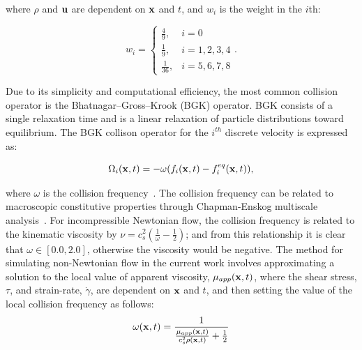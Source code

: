 \noindent where $\rho$ and $\mathbf{u}$ are dependent on $\mathbf{x}$ and $t$, and $w_i$ is the weight in the $i$th:%

\begin{equation} \label{eq:weights}
w_i = \begin{cases}
    \frac{4}{9}, & i = 0 \\
    \frac{1}{9}, & i = 1, 2, 3, 4 \\
    \frac{1}{36}, & i = 5, 6, 7, 8
\end{cases}.
\end{equation}

Due to its simplicity and computational efficiency, the most common collision operator is the Bhatnagar--Gross--Krook (BGK) operator.
BGK consists of a single relaxation time and is a linear relaxation of particle distributions toward equilibrium.
The BGK collison operator for the $i^{th}$ discrete velocity is expressed as:

\begin{equation} \label{eq:bgk}
\Omega_i(\mathbf{x}, t) = -\omega (f_i(\mathbf{x}, t) - f_i^{eq}(\mathbf{x}, t)),
\end{equation}

\noindent where $\omega$ is the collision frequency~\cite{Bha54}.
The collision frequency can be related to macroscopic constitutive properties through Chapman-Enskog multiscale analysis~\cite{wolf2000lattice}.
For incompressible Newtonian flow, the collision frequency is related to the kinematic viscosity by $\nu = c_s^2(\frac{1}{\omega} - \frac{1}{2})$; and from this relationship it is clear that $\omega \in [0.0, 2.0]$, otherwise the viscosity would be negative.
The method for simulating non-Newtonian flow in the current work involves approximating a solution to the local value of apparent viscosity, $\mu_{app}(\mathbf{x}, t)$, where the shear stress, $\tau$, and strain-rate, $\dot{\gamma}$, are dependent on $\mathbf{x}$ and $t$, and then setting the value of the local collision frequency as follows:
\begin{equation} \label{eq:colfeq-non-newtonian}
\omega(\mathbf{x}, t) = \frac{1}{\frac{\mu_{app}(\mathbf{x}, t)}{c_s^2 \rho(\mathbf{x}, t)} + \frac{1}{2}}
\end{equation}

